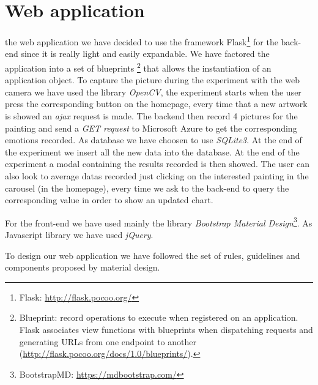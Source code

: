 \documentclass[journal, a4paper]{IEEEtran}
\begin{document}
\section{Web application}
 the web application we have decided to use the framework Flask\footnote{Flask: \url{http://flask.pocoo.org/}} for the back-end since it is really light and easily expandable. We have factored the application into a set of blueprints \footnote{Blueprint: record operations to execute when registered on an application. Flask associates view functions with blueprints when dispatching requests and generating URLs from one endpoint to another (\url{http://flask.pocoo.org/docs/1.0/blueprints/}).} that allows the instantiation of an application object. To capture the picture during the experiment with the web camera we have used the library \textit{OpenCV}, the experiment starts when the user press the corresponding button on the homepage, every time that a new artwork is showed an \textit{ajax} request is made. The backend then record 4 pictures for the painting and send a \textit{GET request} to Microsoft Azure to get the corresponding emotions recorded. As database we have choosen to use \textit{SQLite3}. At the end of the experiment we insert all the new data into the database. At the end of the experiment a modal containing the results recorded is then showed. The user can also look to average datas recorded just clicking on the interested painting in the carousel (in the homepage), every time we ask to the back-end to query the corresponding value in order to show an updated chart.

For the front-end we have used mainly the library \textit{Bootstrap Material Design}\footnote{BootstrapMD: \url{https://mdbootstrap.com/}}. As Javascript library we have used \textit{jQuery}.

To design our web application we have followed the set of rules, guidelines and components proposed by material design.
\end{document}
